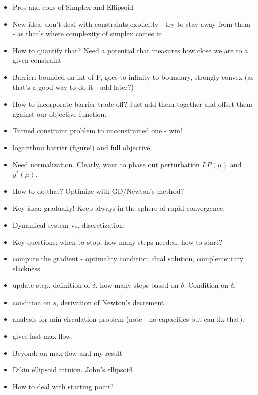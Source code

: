 \documentclass{article}
\begin{document}
\begin{itemize}
\item Pros and cons of Simplex and Ellipsoid
\item New idea: don't deal with constraints explicitly - try to stay away from them - as that's where complexity of simplex comes in
\item How to quantify that? Need a potential that measures how close we are to a given constraint
\item Barrier: bounded on int of P, goes to infinity to boundary, strongly convex (as that's a good way to do it - add later?)
\item How to incorporate barrier trade-off? Just add them together and offset them against our objective function.

\item Turned constraint problem to unconstrained one - win! 
\item logarithmi barrier (figure!) and full objective
\item Need normalization.  Clearly, want to phase out perturbation $LP(\mu)$ and $y^*(\mu)$. 
\item How to do that? Optimize with GD/Newton's method?
\item Key idea: gradually! Keep always in the sphere of rapid convergence. 
\item Dynamical system vs. discretization. 
\item Key questions: when to stop, how many steps needed, how to start? 
\item compute the gradient - optimality condition, dual solution, complementary slackness
\item update step, definition of $\delta$, how many steps based on $\delta$. Condition on $\delta$. 
\item condition on $s$, derivation of Newton's decrement. 
\item analysis for min-circulation problem (note - no capacities but can fix that). 
\item gives fast max flow. 
\item Beyond: on max flow and my result
\item Dikin ellipsoid intuion. John's ellipsoid.
\item How to deal with starting point?
\end{itemize}
\end{document}
